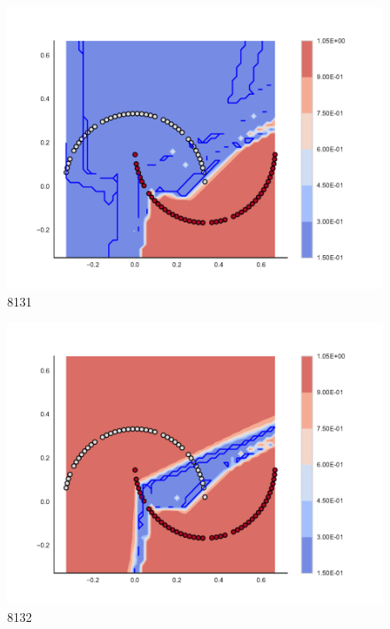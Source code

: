 \begin{subfigure}[b]{0.09\textwidth}
    \includegraphics[clip, trim=2.35cm 1.75cm 4.5cm 0cm,width=\textwidth]{img/convergence/8131.pdf}
    \caption{8131}
    \label{fig:convergence_8131}
\end{subfigure}
%
\begin{subfigure}[b]{0.09\textwidth}
    \includegraphics[clip, trim=2.35cm 1.75cm 4.5cm 0cm,width=\textwidth]{img/convergence/8132.pdf}
    \caption{8132}
    \label{fig:convergence_8132}
\end{subfigure}
%
